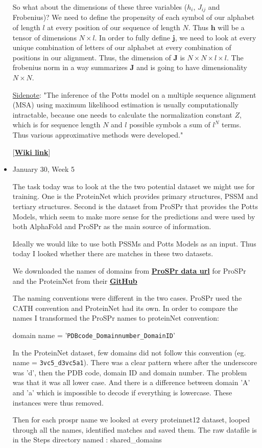 \documentclass[11pt]{article}
\begin{document}
\begin{itemize}
    So what about the dimensions of these three variables ($h_i$, $J_{ij}$ and Frobenius)? We need to define the propensity of each symbol of our alphabet of length $l$ at every position of our sequence of length $N$. Thus $\bm{h}$ will be a tensor of dimensions $N \times l$. In order to fully define $\bm{j}$, we need to look at every unique combination of letters of our alphabet at every combination of positions in our alignment. Thus, the dimension of $\bm{J}$ is $N \times N \times l \times l$. The frobenius norm in a way summarizes $\bm{J}$ and is going to have dimensionality $N \times N$. 
    
    \underline{Sidenote}: "The inference of the Potts model on a multiple sequence alignment (MSA) using maximum likelihood estimation is usually computationally intractable, because one needs to calculate the normalization constant $Z$, which is for sequence length $N$ and $l$ possible symbols a sum of $l^N$ terms. Thus various approximative methods were developed."
    
    [\hyperlink{https://en.wikipedia.org/wiki/Direct_coupling_analysis}{\textbf{Wiki link}}]
    
    \item January 30, Week 5
    
The task today was to look at the the two potential dataset we might use for training. One is the ProteinNet which provides primary structures, PSSM and tertiary structures. Second is the dataset from ProSPr that provides the Potts Models, which seem to make more sense for the predictions and were used by both AlphaFold and ProSPr as the main source of information.

Ideally we would like to use both PSSMs and Potts Models as an input. Thus today I looked whether there are matches in these two datasets.

We downloaded the names of domains from \href{https://byu.app.box.com/v/ProteinStructurePrediction/folder/87035331084 }{\textbf{ProSPr data url}} for ProSPr and the ProteinNet from their \href{https://github.com/aqlaboratory/proteinnet}{\textbf{GitHub}}

The naming conventions were different in the two cases. ProSPr used the CATH convention and ProteinNet had its own. In order to compare the names I transformed the ProSPr names to proteinNet convention: 

\begin{center}
    domain name = '\texttt{PDBcode\_Domainnumber\_DomainID}'
\end{center}

In the ProteinNet dataset, few domains did not follow this convention (eg. name = \texttt{3vc5\_d3vc5a1}). There was a clear pattern where after the underscore was 'd', then the PDB code, domain ID and domain number. The problem was that it was all lower case. And there is a difference between domain 'A' and 'a' which is impossible to decode if everything is lowercase. These instances were thus removed.

Then for each prospr name we looked at every proteinnet12 dataset, looped through all the names, identified matches and saved them. The raw datafile is in the Steps directory named : shared\_domains
\end{itemize}
\end{document}
